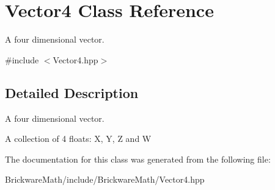 \hypertarget{classVector4}{}\section{Vector4 Class Reference}
\label{classVector4}


A four dimensional vector.  




{\ttfamily \#include $<$Vector4.\+hpp$>$}



\subsection{Detailed Description}
A four dimensional vector. 

A collection of 4 floats\+: X, Y, Z and W 

The documentation for this class was generated from the following file\+:\begin{DoxyCompactItemize}
\item 
Brickware\+Math/include/\+Brickware\+Math/Vector4.\+hpp\end{DoxyCompactItemize}
